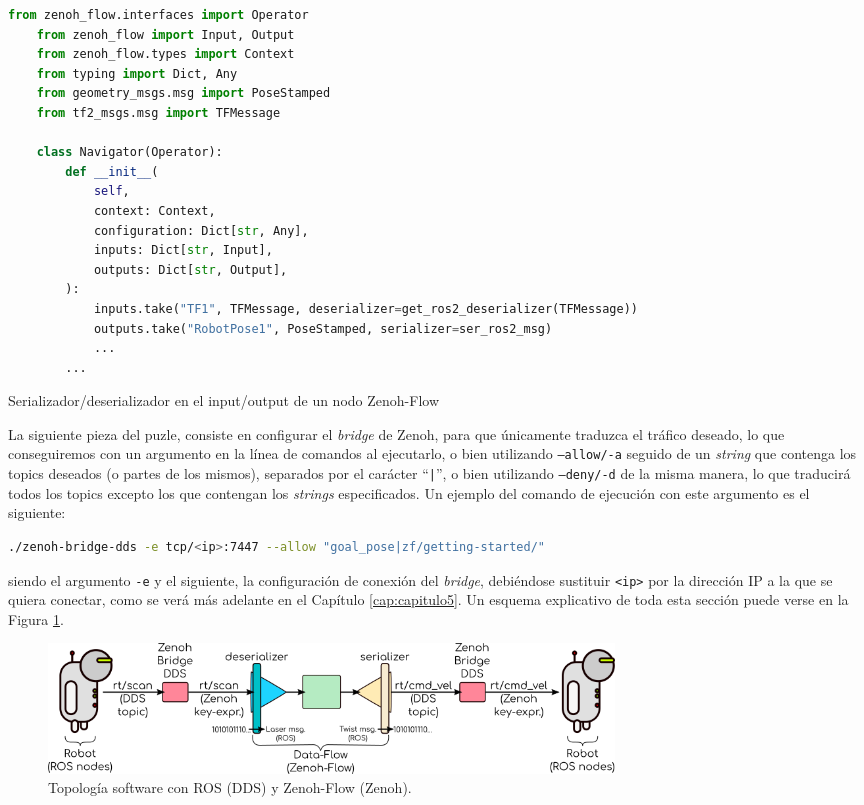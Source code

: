 \begin{code}[H]
  \begin{lstlisting}[language=Python]
    from zenoh_flow.interfaces import Operator
    from zenoh_flow import Input, Output
    from zenoh_flow.types import Context
    from typing import Dict, Any
    from geometry_msgs.msg import PoseStamped
    from tf2_msgs.msg import TFMessage

    class Navigator(Operator):
        def __init__(
            self,
            context: Context,
            configuration: Dict[str, Any],
            inputs: Dict[str, Input],
            outputs: Dict[str, Output],
        ):
            inputs.take("TF1", TFMessage, deserializer=get_ros2_deserializer(TFMessage))
            outputs.take("RobotPose1", PoseStamped, serializer=ser_ros2_msg)
            ...
        ...
  \end{lstlisting}
\caption[Serializador/deserializador en los input/output de un nodo Zenoh-Flow]{Serializador/deserializador en el input/output de un nodo Zenoh-Flow}
\label{cod:ros_zf_io}
\end{code}

La siguiente pieza del puzle, consiste en configurar el \textit{bridge} de
Zenoh, para que únicamente traduzca el tráfico deseado, lo que conseguiremos con
un argumento en la línea de comandos al ejecutarlo, o bien utilizando
\texttt{--allow/-a} seguido de un \textit{string} que contenga los topics
deseados (o partes de los mismos), separados por el carácter ``\texttt{|}'', o
bien utilizando \texttt{--deny/-d} de la misma manera, lo que traducirá todos
los topics excepto los que contengan los \textit{strings} especificados.
Un ejemplo del comando de ejecución con este argumento es el siguiente:
\begin{lstlisting}[language=bash]
  ./zenoh-bridge-dds -e tcp/<ip>:7447 --allow "goal_pose|zf/getting-started/"
\end{lstlisting}
siendo el argumento \texttt{-e} y el siguiente, la configuración de conexión del
\textit{bridge}, debiéndose sustituir \verb|<ip>| por la dirección IP a la que
se quiera conectar, como se verá más adelante en el Capítulo
\ref{cap:capitulo5}.
Un esquema explicativo de toda esta sección puede verse en la Figura
\ref{fig:zenoh_dds_topology}.
\\

\begin{figure} [h!]
  \begin{center}
    \includegraphics[width=15cm]{figs/zenoh_dds_topology}
  \end{center}
  \caption{Topología software con ROS (DDS) y Zenoh-Flow (Zenoh).}
  \label{fig:zenoh_dds_topology}
\end{figure}\











